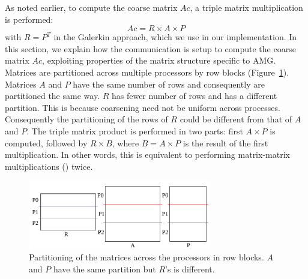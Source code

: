 
As noted earlier, to compute the coarse matrix $Ac$, a triple matrix multiplication is performed:
\begin{equation}
 Ac = R \times A \times P
\end{equation}
with $R = P^T$ in the Galerkin approach, which we use in our implementation.
%
In this section, we explain how the communication is setup to compute the coarse matrix $Ac$, exploiting properties of the matrix structure specific to AMG. 
%
Matrices are partitioned across multiple processors by row blocks (Figure~\ref{fig:partition}). Matrices $A$ and $P$ have the same number of rows and consequently are partitioned the same way. $R$ has fewer number of rows and has a different partition. This is because coarsening need not be uniform across processes. Consequently the partitioning of the rows of $R$ could be different from that of $A$ and $P$. The triple matrix product is performed in two parts: first $A \times P$ is computed, followed by $R \times B$, where $B = A \times P$ is the result of the first multiplication. In other words, this is equivalent to performing matrix-matrix multiplications (\mm) twice.

\begin{figure}[tbh]
 \centering
 \includegraphics[width=8cm,height=3cm]{./figures/partition.pdf}
 \caption{Partitioning of the matrices across the processors in row blocks. $A$ and $P$ have the same partition but $R$'s is different.}
 \label{fig:partition}
\end{figure}

